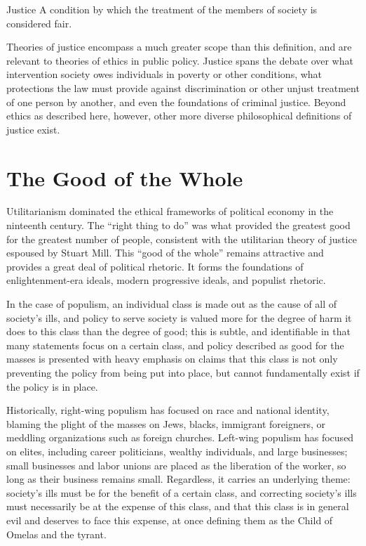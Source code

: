 \begin{definition}{Justice}
    A condition by which the treatment of the members of society is considered fair.
\end{definition}

Theories of justice encompass a much greater scope than this definition, and are relevant to theories of ethics in public policy.  Justice spans the debate over what intervention society owes individuals in poverty or other conditions, what protections the law must provide against discrimination or other unjust treatment of one person by another, and even the foundations of criminal justice.  Beyond ethics as described here, however, other more diverse philosophical definitions of justice exist.

\section{The Good of the Whole}

Utilitarianism dominated the ethical frameworks of political economy in the ninteenth century.  The ``right thing to do'' was what provided the greatest good for the greatest number of people, consistent with the utilitarian theory of justice espoused by Stuart Mill.  This ``good of the whole'' remains attractive and provides a great deal of political rhetoric.  It forms the foundations of enlightenment-era ideals, modern progressive ideals, and populist rhetoric.

In the case of populism, an individual class is made out as the cause of all of society's ills, and policy to serve society is valued more for the degree of harm it does to this class than the degree of good; this is subtle, and identifiable in that many statements focus on a certain class, and policy described as good for the masses is presented with heavy emphasis on claims that this class is not only preventing the policy from being put into place, but cannot fundamentally exist if the policy is in place.

Historically, right-wing populism has focused on race and national identity, blaming the plight of the masses on Jews, blacks, immigrant foreigners, or meddling organizations such as foreign churches.  Left-wing populism has focused on elites, including career politicians, wealthy individuals, and large businesses; small businesses and labor unions are placed as the liberation of the worker, so long as their business remains small.  Regardless, it carries an underlying theme:  society's ills must be for the benefit of a certain class, and correcting society's ills must necessarily be at the expense of this class, and that this class is in general evil and deserves to face this expense, at once defining them as the Child of Omelas and the tyrant.

